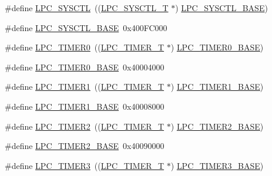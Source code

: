 \begin{DoxyCompactItemize}
\item 
\#define \hyperlink{group__PERIPH__407X__8X__BASE_ga30cc92eba86b30295b3dcf3da503b736}{L\+P\+C\+\_\+\+S\+Y\+S\+C\+TL}~((\hyperlink{structLPC__SYSCTL__T}{L\+P\+C\+\_\+\+S\+Y\+S\+C\+T\+L\+\_\+T}           $\ast$) \hyperlink{group__PERIPH__407X__8X__BASE_gae4670b50fe27772fa31de1da10bec7b7}{L\+P\+C\+\_\+\+S\+Y\+S\+C\+T\+L\+\_\+\+B\+A\+SE})
\item 
\#define \hyperlink{group__PERIPH__407X__8X__BASE_gae4670b50fe27772fa31de1da10bec7b7}{L\+P\+C\+\_\+\+S\+Y\+S\+C\+T\+L\+\_\+\+B\+A\+SE}~0x400\+F\+C000
\item 
\#define \hyperlink{group__PERIPH__407X__8X__BASE_ga800f32a8a38d9e9c8f3b6ab161f6f2d2}{L\+P\+C\+\_\+\+T\+I\+M\+E\+R0}~((\hyperlink{structLPC__TIMER__T}{L\+P\+C\+\_\+\+T\+I\+M\+E\+R\+\_\+T}            $\ast$) \hyperlink{group__PERIPH__407X__8X__BASE_ga58d2cc2a6a4bd9319853ad5b62a20d43}{L\+P\+C\+\_\+\+T\+I\+M\+E\+R0\+\_\+\+B\+A\+SE})
\item 
\#define \hyperlink{group__PERIPH__407X__8X__BASE_ga58d2cc2a6a4bd9319853ad5b62a20d43}{L\+P\+C\+\_\+\+T\+I\+M\+E\+R0\+\_\+\+B\+A\+SE}~0x40004000
\item 
\#define \hyperlink{group__PERIPH__407X__8X__BASE_ga0d28200f11e877cece24025ebe7fe72a}{L\+P\+C\+\_\+\+T\+I\+M\+E\+R1}~((\hyperlink{structLPC__TIMER__T}{L\+P\+C\+\_\+\+T\+I\+M\+E\+R\+\_\+T}            $\ast$) \hyperlink{group__PERIPH__407X__8X__BASE_ga077e94a95d95d79f6aeb0ea962377c46}{L\+P\+C\+\_\+\+T\+I\+M\+E\+R1\+\_\+\+B\+A\+SE})
\item 
\#define \hyperlink{group__PERIPH__407X__8X__BASE_ga077e94a95d95d79f6aeb0ea962377c46}{L\+P\+C\+\_\+\+T\+I\+M\+E\+R1\+\_\+\+B\+A\+SE}~0x40008000
\item 
\#define \hyperlink{group__PERIPH__407X__8X__BASE_gae0a3c421e7e1ac3ffd7e740e33387dc5}{L\+P\+C\+\_\+\+T\+I\+M\+E\+R2}~((\hyperlink{structLPC__TIMER__T}{L\+P\+C\+\_\+\+T\+I\+M\+E\+R\+\_\+T}            $\ast$) \hyperlink{group__PERIPH__407X__8X__BASE_gab46122134a159b494e060ae3a7be0967}{L\+P\+C\+\_\+\+T\+I\+M\+E\+R2\+\_\+\+B\+A\+SE})
\item 
\#define \hyperlink{group__PERIPH__407X__8X__BASE_gab46122134a159b494e060ae3a7be0967}{L\+P\+C\+\_\+\+T\+I\+M\+E\+R2\+\_\+\+B\+A\+SE}~0x40090000
\item 
\#define \hyperlink{group__PERIPH__407X__8X__BASE_gab34ae64ea250497b5148b7ffb61d04f5}{L\+P\+C\+\_\+\+T\+I\+M\+E\+R3}~((\hyperlink{structLPC__TIMER__T}{L\+P\+C\+\_\+\+T\+I\+M\+E\+R\+\_\+T}            $\ast$) \hyperlink{group__PERIPH__407X__8X__BASE_ga002e95d51eef32473052ea2575440eac}{L\+P\+C\+\_\+\+T\+I\+M\+E\+R3\+\_\+\+B\+A\+SE})

\end{DoxyCompactItemize}

